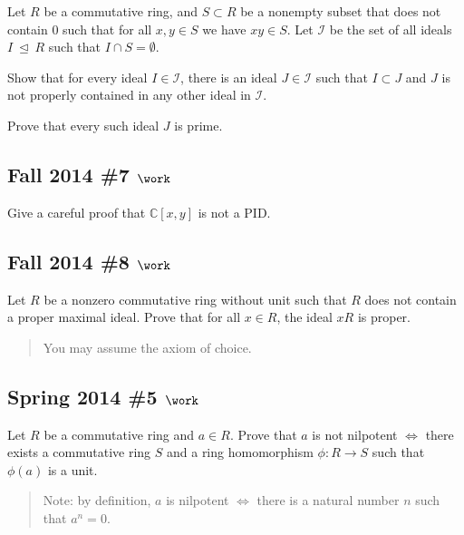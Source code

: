 Let \(R\) be a commutative ring, and \(S\subset R\) be a nonempty subset
that does not contain 0 such that for all \(x, y\in S\) we have
\(xy\in S\). Let \({\mathcal{I}}\) be the set of all ideals
\(I{~\trianglelefteq~}R\) such that \(I\cap S = \emptyset\).

Show that for every ideal \(I\in {\mathcal{I}}\), there is an ideal
\(J\in {\mathcal{I}}\) such that \(I\subset J\) and \(J\) is not
properly contained in any other ideal in \({\mathcal{I}}\).

Prove that every such ideal \(J\) is prime.

\hypertarget{fall-2014-7-work}{%
\subsection{\texorpdfstring{Fall 2014 \#7
\(\work\)}{Fall 2014 \#7 \textbackslash work}}\label{fall-2014-7-work}}

Give a careful proof that \({\mathbb{C}}[x, y]\) is not a PID.

\hypertarget{fall-2014-8-work}{%
\subsection{\texorpdfstring{Fall 2014 \#8
\(\work\)}{Fall 2014 \#8 \textbackslash work}}\label{fall-2014-8-work}}

Let \(R\) be a nonzero commutative ring without unit such that \(R\)
does not contain a proper maximal ideal. Prove that for all \(x\in R\),
the ideal \(xR\) is proper.

\begin{quote}
You may assume the axiom of choice.
\end{quote}

\hypertarget{spring-2014-5-work}{%
\subsection{\texorpdfstring{Spring 2014 \#5
\(\work\)}{Spring 2014 \#5 \textbackslash work}}\label{spring-2014-5-work}}

Let \(R\) be a commutative ring and \(a\in R\). Prove that \(a\) is not
nilpotent \(\iff\) there exists a commutative ring \(S\) and a ring
homomorphism \(\phi: R\to S\) such that \(\phi(a)\) is a unit.

\begin{quote}
Note: by definition, \(a\) is nilpotent \(\iff\) there is a natural
number \(n\) such that \(a^n = 0\).
\end{quote}

